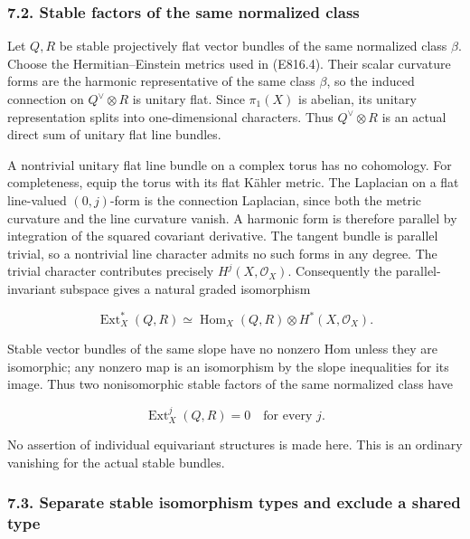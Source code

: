 \subsubsection{7.2. Stable factors of the same normalized
class}\label{SF-E816-stable-factors-of-the-same-normalized-class}

Let \(Q,R\) be stable projectively flat vector bundles of the same
normalized class \(\beta\). Choose the Hermitian--Einstein metrics used
in (E816.4). Their scalar curvature forms are the harmonic
representative of the same class \(\beta\), so the induced connection on
\(Q^\vee\otimes R\) is unitary flat. Since \(\pi_1(X)\) is abelian, its
unitary representation splits into one-dimensional characters. Thus
\(Q^\vee\otimes R\) is an actual direct sum of unitary flat line
bundles.

A nontrivial unitary flat line bundle on a complex torus has no
cohomology. For completeness, equip the torus with its flat Kähler
metric. The Laplacian on a flat line-valued \((0,j)\)-form is the
connection Laplacian, since both the metric curvature and the line
curvature vanish. A harmonic form is therefore parallel by integration
of the squared covariant derivative. The tangent bundle is parallel
trivial, so a nontrivial line character admits no such forms in any
degree. The trivial character contributes precisely
\(H^j(X,\mathcal O_X)\). Consequently the parallel-invariant subspace
gives a natural graded isomorphism

\[
 \operatorname{Ext}^*_X(Q,R)
     \simeq\operatorname{Hom}_X(Q,R)\otimes
                    H^*(X,\mathcal O_X).
 \tag{E816.29}
\]

Stable vector bundles of the same slope have no nonzero Hom unless they
are isomorphic; any nonzero map is an isomorphism by the slope
inequalities for its image. Thus two nonisomorphic stable factors of the
same normalized class have

\[
 \operatorname{Ext}^j_X(Q,R)=0\quad\text{for every }j.
 \tag{E816.30}
\]

No assertion of individual equivariant structures is made here. This is
an ordinary vanishing for the actual stable bundles.

\subsubsection{7.3. Separate stable isomorphism types and exclude a
shared
type}\label{SF-E816-separate-stable-isomorphism-types-and-exclude-a-shared-type}

